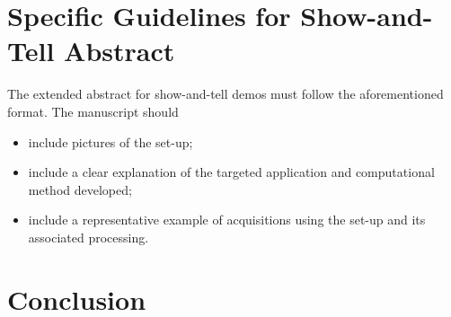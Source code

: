 \documentclass[9pt,conference]{IEEEtran}
\begin{document}
\section{Specific Guidelines for Show-and-Tell Abstract} \label{sec:show-and-tell}
The extended abstract for show-and-tell demos must follow the aforementioned format. The manuscript should 
\begin{itemize}
\item include pictures of the set-up;
\item include a clear explanation of the targeted application and computational method developed;
\item include a representative example of acquisitions using the set-up and its associated processing. 
\end{itemize}

\section{Conclusion}




\end{document}
